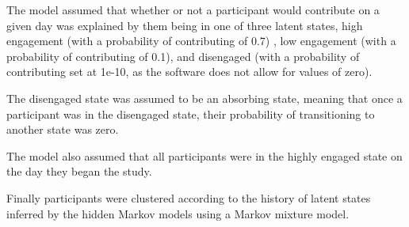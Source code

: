 \documentclass[
]{article}
\begin{document}
The model assumed that whether or not a participant would contribute on
a given day was explained by them being in one of three latent states,
high engagement (with a probability of contributing of 0.7) , low
engagement (with a probability of contributing of 0.1), and disengaged
(with a probability of contributing set at 1e-10, as the software does
not allow for values of zero).

The disengaged state was assumed to be an absorbing state, meaning that
once a participant was in the disengaged state, their probability of
transitioning to another state was zero.

The model also assumed that all participants were in the highly engaged
state on the day they began the study.

Finally participants were clustered according to the history of latent
states inferred by the hidden Markov models using a Markov mixture
model.
\end{document}
